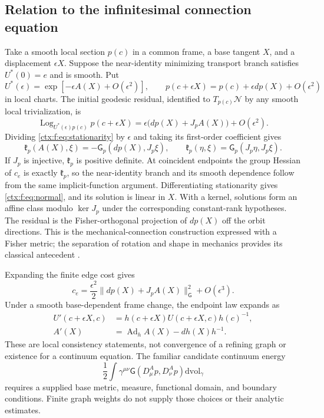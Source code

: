 \subsection{Relation to the infinitesimal connection equation}

Take a smooth local section $p(c)$ in a common frame, a base tangent $X$, and a displacement $\epsilon X$. Suppose the near-identity minimizing transport branch satisfies $U^*(0)=e$ and is smooth. Put
\begin{equation}
 U^*(\epsilon)=\exp[-\epsilon A(X)+O(\epsilon^2)],\qquad
 p(c+\epsilon X)=p(c)+\epsilon dp(X)+O(\epsilon^2)
\end{equation}
in local charts. The initial geodesic residual, identified to $T_{p(c)}\mathcal N$ by any smooth local trivialization, is
\begin{equation}
 \operatorname{Log}_{U^*(\epsilon)p(c)}p(c+\epsilon X)
 =\epsilon\bigl(dp(X)+J_pA(X)\bigr)+O(\epsilon^2).
\end{equation}
Dividing \cref{ctx:f:eq:stationarity} by $\epsilon$ and taking its first-order coefficient gives
\begin{equation}
 \boxed{\mathfrak k_p(A(X),\xi)=-\mathsf G_p(dp(X),J_p\xi),\qquad
 \mathfrak k_p(\eta,\xi)=\mathsf G_p(J_p\eta,J_p\xi).}
 \label{ctx:f:eq:normal}
\end{equation}
If $J_p$ is injective, $\mathfrak k_p$ is positive definite. At coincident endpoints the group Hessian of $c_e$ is exactly $\mathfrak k_p$, so the near-identity branch and its smooth dependence follow from the same implicit-function argument. Differentiating stationarity gives \cref{ctx:f:eq:normal}, and its solution is linear in $X$. With a kernel, solutions form an affine class modulo $\ker J_p$ under the corresponding constant-rank hypotheses. The residual is the Fisher-orthogonal projection of $dp(X)$ off the orbit directions. This is the mechanical-connection construction expressed with a Fisher metric; the separation of rotation and shape in mechanics provides its classical antecedent \cite{LittlejohnReinsch1997}.

Expanding the finite edge cost gives
\begin{equation}
 c_e=\frac{\epsilon^2}{2}\|dp(X)+J_pA(X)\|_\mathsf G^2+O(\epsilon^3).
\end{equation}
Under a smooth base-dependent frame change, the endpoint law expands as
\begin{align}
 U'(c+\epsilon X,c)&=h(c+\epsilon X)U(c+\epsilon X,c)h(c)^{-1},\\
 A'(X)&=\operatorname{Ad}_h A(X)-dh(X)h^{-1}.
\end{align}
These are local consistency statements, not convergence of a refining graph or existence for a continuum equation. The familiar candidate continuum energy
\begin{equation}
 \frac12\int\gamma^{\mu\nu}\mathsf G(D^A_\mu p,D^A_\nu p)\mathrm{dvol}_\gamma
\end{equation}
requires a supplied base metric, measure, functional domain, and boundary conditions. Finite graph weights do not supply those choices or their analytic estimates.

